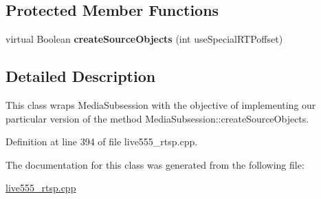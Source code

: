 \subsection*{Protected Member Functions}
\begin{DoxyCompactItemize}
\item 
virtual Boolean {\bfseries create\+Source\+Objects} (int use\+Special\+R\+T\+Poffset)\hypertarget{classSimpleClientMediaSubsession_af020c9ea462bd48ebba940e9c4714994}{}\label{classSimpleClientMediaSubsession_af020c9ea462bd48ebba940e9c4714994}

\end{DoxyCompactItemize}


\subsection{Detailed Description}
This class wraps Media\+Subsession with the objective of implementing our particular version of the method Media\+Subsession\+::create\+Source\+Objects. 

Definition at line 394 of file live555\+\_\+rtsp.\+cpp.



The documentation for this class was generated from the following file\+:\begin{DoxyCompactItemize}
\item 
\hyperlink{live555__rtsp_8cpp}{live555\+\_\+rtsp.\+cpp}\end{DoxyCompactItemize}
